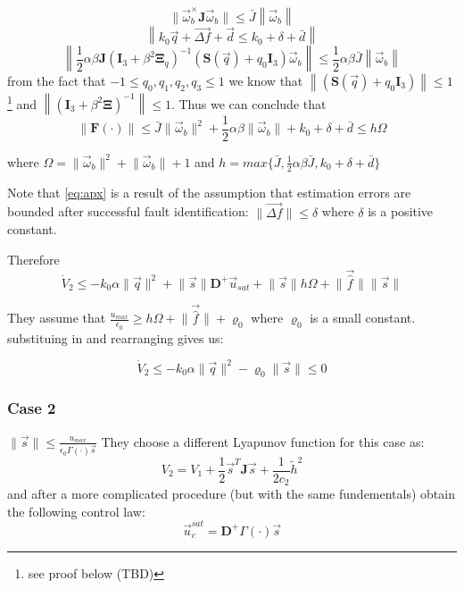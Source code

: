 \begin{equation}
    \lVert\vec{\omega}_b^\times\mathbf{J}\vec{\omega}_b \rVert \leq \bar{J}\left\lVert\vec{\omega}_b\right\rVert 
\end{equation}
\begin{equation}
    \left\lVert k_0\vec{q} + \vec{\Delta f} + \vec{d} \leq k_0 + \delta + \bar{d}\right\rVert \label{eq:apx}
\end{equation}
\begin{equation}
    \left\lVert\frac{1}{2}\alpha\beta\mathbf{J}(\mathbf{I}_3 + \beta^2\mathbf{\Xi}_q)^{-1}(\mathbf{S}(\vec{q}) + q_0\mathbf{I}_3)\vec{\omega}_b\right\rVert \leq \frac{1}{2}\alpha\beta\bar{J}\left\lVert\vec{\omega}_b\right\rVert 
\end{equation}
from the fact that $-1 \leq q_0,q_1,q_2,q_3 \leq 1$ we know that $\left\lVert(\mathbf{S}(\vec{q}) + q_0\mathbf{I}_3)\right\rVert  \leq 1$\footnote{see proof below (TBD)} and $\left\lVert(\mathbf{I}_3+\beta^2\mathbf{\Xi})^{-1}\right\rVert  \leq 1$. Thus we can conclude that 
\begin{equation}
    \lVert\mathbf{F}(\cdot)\rVert \leq \bar{J}\lVert\vec{\omega}_b\rVert^2 + \frac{1}{2}\alpha\beta\lVert\vec{\omega}_b\rVert + k_0 + \delta + \bar{d}	\leq h\Omega
\end{equation}

where $\Omega = \lVert\vec{\omega}_b\rVert^2 + \lVert\vec{\omega}_b\rVert + 1$ and $h=max\{\bar{J},\frac{1}{2}\alpha\beta\bar{J},k_0 + \delta + \bar{d}\}$

Note that \ref{eq:apx} is a result of the assumption that estimation errors are bounded after successful fault identification: $\lVert\vec{\Delta f}\rVert \leq \delta$ where $\delta$ is a positive constant.

Therefore 
\begin{equation}
    \dot{V}_2 \leq -k_0\alpha\lVert \vec{q} \rVert^2 + \lVert \vec{s} \rVert\mathbf{D}^+\vec{u}_{sat} + \lVert \vec{s} \rVert h \Omega + \lVert \vec{\hat{f}} \rVert\lVert \vec{s} \rVert
\end{equation}

They assume that $\frac{u_{max}}{\epsilon_0} \geq h\Omega + \lVert \vec{\hat{f}} \rVert + \varrho_0$ where $\varrho_0$ is a small constant. substituing in and rearranging gives us:

\begin{equation}
    \dot{V}_2 \leq -k_0\alpha\lVert \vec{q} \rVert^2 - \varrho_0\lVert \vec{s} \rVert \leq 0
\end{equation}
\subsubsection{Case 2} $\lVert \vec{s} \rVert \leq \frac{u_{max}}{\epsilon_0\Gamma(\cdot)\vec{s}}$
They choose a different Lyapunov function for this case as:
\begin{equation}
    V_2=V_1+\frac{1}{2}\vec{s}^T\mathbf{J}\vec{s} + \frac{1}{2c_2}\tilde{h}^2
\end{equation}
and after a more complicated procedure (but with the same fundementals) obtain the following control law:
\begin{equation}
    \vec{u}_c^{sat} = \mathbf{D}^+ \Gamma(\cdot) \vec{s}
\end{equation}